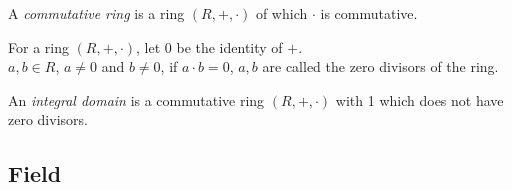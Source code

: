 \documentclass{report}
\begin{document}
		\begin{defn} \label{def_commutative_ring}
			A \emph{commutative ring} is a ring $(R,+,\cdot)$ of which $\cdot$ is commutative.
		\end{defn}

		\begin{defn} \label{def_zero_divisor}
			For a ring $(R,+,\cdot)$, let $0$ be the identity of $+$.\\
			$a,b\in R$, $a \neq 0$ and $b \neq 0$, if $a \cdot b=0$, $a,b$ are called the zero divisors of the ring.
		\end{defn}

		\begin{defn} \label{def_integral_domain}
			An \emph{integral domain} is a commutative ring $(R,+,\cdot)$ with 1 which does not have zero divisors.
		\end{defn}

		\subsection{Field}
\end{document}
